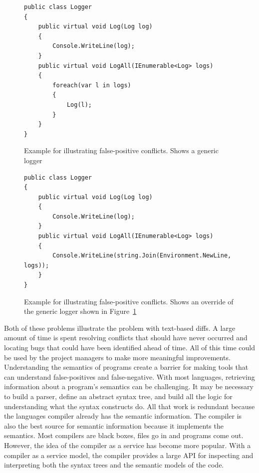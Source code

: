 \documentclass[draftclsnofoot,onecolumn]{IEEEtran}
\begin{document}
\begin{figure}[!htb]
\centering
\begin{lstlisting}
public class Logger
{
    public virtual void Log(Log log)
    {
        Console.WriteLine(log);
    }
    public virtual void LogAll(IEnumerable<Log> logs)
    {
        foreach(var l in logs)
        {
            Log(l);
        }
    }
}
\end{lstlisting}
\caption{Example for illustrating false-positive conflicts. Shows a generic 
logger}
\label{example1}
\end{figure}

\begin{figure}[!htb]
\centering
\begin{lstlisting}
public class Logger
{
    public virtual void Log(Log log)
    {
        Console.WriteLine(log);
    }
    public virtual void LogAll(IEnumerable<Log> logs)
    {
        Console.WriteLine(string.Join(Environment.NewLine, logs));
    }
}
\end{lstlisting}
\caption{Example for illustrating false-positive conflicts. Shows an override 
of the generic logger shown in Figure~\ref{example1}}
\label{example2}
\end{figure}

Both of these problems illustrate the problem with text-based diffs. A large 
amount of time is spent resolving conflicts that should have never occurred and 
locating bugs that could have been identified ahead of time. All of this time 
could be used by the project managers to make more meaningful improvements. 
Understanding the semantics of programs create a barrier for making tools that 
can understand false-positives and false-negative. With most languages, 
retrieving information about a program's semantics can be challenging. It may 
be necessary to build a parser, define an abstract syntax tree, and build all 
the logic for understanding what the syntax constructs do. All that work is 
redundant because the languages compiler already has the semantic information. 
The compiler is also the best source for semantic information because it 
implements the semantics. Most compilers are black boxes, files go in and 
programs come out. However, the idea of the compiler as a service has become 
more popular. With a compiler as a service model, the compiler provides a 
large API for inspecting and interpreting both the syntax trees and the 
semantic models of the code. 
\end{document}
